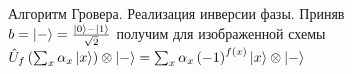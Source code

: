 \begin{figure}
\centering



\caption{Алгоритм Гровера. Реализация инверсии фазы. Приняв
  $b=\ket{-} = \frac{\ket{0} -
    \ket{1}}{\sqrt{2}}$ получим для изображенной схемы
$\hat{U}_{f}\left(\sum_x \alpha_x \ket{x}\right)\otimes\ket{-} = 
\sum_x \alpha_x
\left(-1\right)^{f\left(x\right)}\ket{x}\otimes\ket{-}$} 
\label{figQuantCompGroverPhaseInvImpl}
\end{figure}
